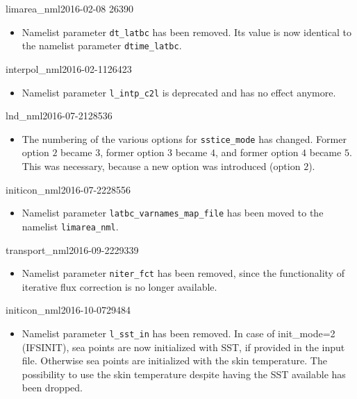 \begin{changeitem}{limarea\_nml}{2016-02-08 }{26390}
  \begin{itemize}
   \item Namelist parameter \texttt{dt\_latbc} has been removed. Its value is now
         identical to the namelist parameter \texttt{dtime\_latbc}.
  \end{itemize}
\end{changeitem}

\begin{changeitem}{interpol\_nml}{2016-02-11}{26423}
  \begin{itemize}
   \item Namelist parameter \texttt{l\_intp\_c2l} is deprecated and has no effect anymore.
  \end{itemize}
\end{changeitem}

\begin{changeitem}{lnd\_nml}{2016-07-21}{28536}
  \begin{itemize}
   \item The numbering of the various options for \texttt{sstice\_mode} has changed. Former option $2$ became $3$,
   former option $3$ became $4$, and former option $4$ became $5$. This was necessary, because a new option was introduced (option $2$).
  \end{itemize}
\end{changeitem}

\begin{changeitem}{initicon\_nml}{2016-07-22}{28556}
  \begin{itemize}
   \item Namelist parameter \texttt{latbc\_varnames\_map\_file} has
     been moved to the namelist \texttt{limarea\_nml}.
  \end{itemize}
\end{changeitem}

\begin{changeitem}{transport\_nml}{2016-09-22}{29339}
  \begin{itemize}
   \item Namelist parameter \texttt{niter\_fct} has been removed, since the functionality of
   iterative flux correction is no longer available.
  \end{itemize}
\end{changeitem}

\begin{changeitem}{initicon\_nml}{2016-10-07}{29484}
  \begin{itemize}
   \item Namelist parameter \texttt{l\_sst\_in} has been removed. In case of init\_mode=2 (IFSINIT),
   sea points are now initialized with SST, if provided in the input file. Otherwise sea points are initialized
   with the skin temperature. The possibility to use the skin temperature despite having the SST available
   has been dropped.
  \end{itemize}
\end{changeitem}

